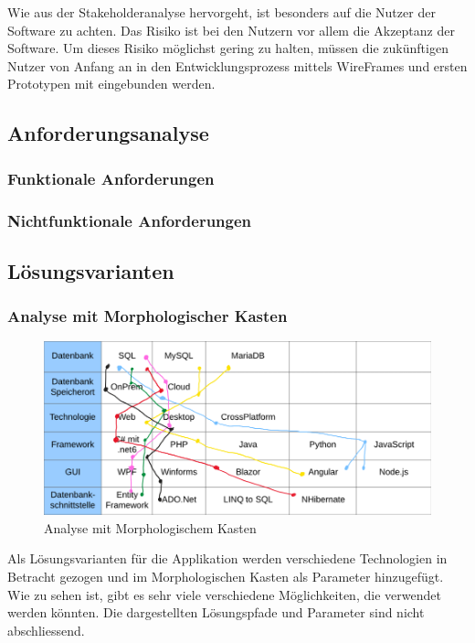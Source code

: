Wie aus der Stakeholderanalyse hervorgeht, ist besonders auf die Nutzer der Software zu achten. Das Risiko ist bei den Nutzern vor allem die Akzeptanz der Software. Um dieses Risiko möglichst gering zu halten, müssen die zukünftigen Nutzer von Anfang an in den Entwicklungsprozess mittels WireFrames und ersten Prototypen mit eingebunden werden.

\subsection{Anforderungsanalyse}
\subsubsection{Funktionale Anforderungen}


\subsubsection{Nichtfunktionale Anforderungen}


\subsection{Lösungsvarianten}
\subsubsection{Analyse mit Morphologischer Kasten}
\begin{figure}[H]
  \begin{center}
    \includegraphics[width=1\linewidth]{content/images/morphoKasten.png}
    \caption{Analyse mit Morphologischem Kasten}
    \label{morphoKasten}
  \end{center}
\end{figure}

Als Lösungsvarianten für die Applikation werden verschiedene Technologien in Betracht gezogen und im Morphologischen Kasten als Parameter hinzugefügt. Wie zu sehen ist, gibt es sehr viele verschiedene Möglichkeiten, die verwendet werden könnten. Die dargestellten Lösungspfade und Parameter sind nicht abschliessend.

